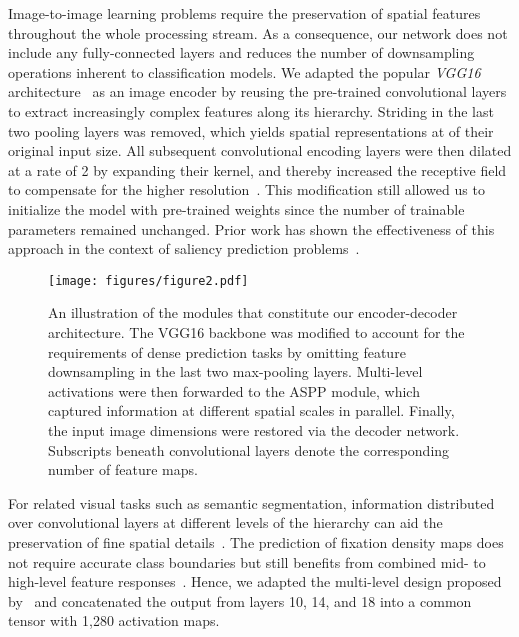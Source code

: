 \documentclass[final,1p,times,number]{elsarticle}
\begin{document}
Image-to-image learning problems require the preservation of spatial features throughout the whole processing stream. As a consequence, our network does not include any fully-connected layers and reduces the number of downsampling operations inherent to classification models. We adapted the popular \textit{VGG16} architecture~\cite{simonyan2014very} as an image encoder by reusing the pre-trained convolutional layers to extract increasingly complex features along its hierarchy. Striding in the last two pooling layers was removed, which yields spatial representations at  of their original input size. All subsequent convolutional encoding layers were then dilated at a rate of 2 by expanding their kernel, and thereby increased the receptive field to compensate for the higher resolution~\cite{yu2015multi}. This modification still allowed us to initialize the model with pre-trained weights since the number of trainable parameters remained unchanged. Prior work has shown the effectiveness of this approach in the context of saliency prediction problems~\cite{Cornia2018PredictingHE,liu2018deep}.

\begin{figure}[t!]
\centering\texttt{[image: figures/figure2.pdf]}
\caption{An illustration of the modules that constitute our encoder-decoder architecture. The VGG16 backbone was modified to account for the requirements of dense prediction tasks by omitting feature downsampling in the last two max-pooling layers. Multi-level activations were then forwarded to the ASPP module, which captured information at different spatial scales in parallel. Finally, the input image dimensions were restored via the decoder network. Subscripts beneath convolutional layers denote the corresponding number of feature maps.} \label{fig:fig2} 
\end{figure}

For related visual tasks such as semantic segmentation, information distributed over convolutional layers at different levels of the hierarchy can aid the preservation of fine spatial details~\cite{hariharan2015hypercolumns,long2015fully}. The prediction of fixation density maps does not require accurate class boundaries but still benefits from combined mid- to high-level feature responses~\cite{kummerer2014deep,kummerer2016deepgaze,cornia2016deep}. Hence, we adapted the multi-level design proposed by~\citet{cornia2016deep} and concatenated the output from layers 10, 14, and 18 into a common tensor with 1,280 activation maps.
\end{document}
